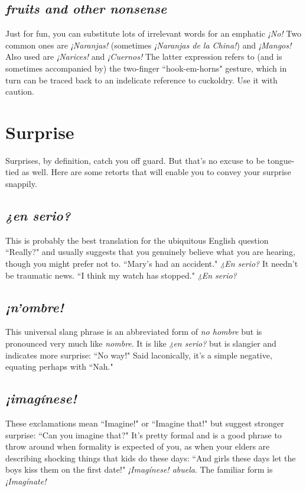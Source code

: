 \subsection{\emph{fruits and other nonsense}}

Just for fun, you can substitute lots of irrelevant words for an
emphatic \emph{¡No!} Two common ones are \emph{¡Naranjas!} (sometimes \emph{¡Naranjas de la China!}) and \emph{¡Mangos!} Also used are \emph{¡Narices!} and \emph{¡Cuernos!}
The latter expression refers to (and is sometimes accompanied by) the
two-finger ``hook-em-horns" gesture, which in turn can be traced back
to an indelicate reference to cuckoldry. Use it with caution.

\section{Surprise}

Surprises, by definition, catch you off guard. But that's no excuse to be tongue-tied as well. Here are some retorts that will enable
you to convey your surprise snappily.

\subsection{\emph{¿en serio?}}

This is probably the best translation for the ubiquitous English
question ``Really?" and usually suggests that you genuinely believe
what you are hearing, though you might prefer not to. ``Mary's had an
accident." \emph{¿En serio?} It needn't be traumatic news. ``I think my watch
has stopped." \emph{¿En serio?}

\subsection{\emph{¡n'ombre!}}

This universal slang phrase is an abbreviated form of \emph{no hombre} but is pronounced very much like \emph{nombre}. It is like \emph{¿en serio?} but
is slangier and indicates more surprise: ``No way!" Said laconically, it's
a simple negative, equating perhaps with ``Nah."

\subsection{\emph{¡imagínese!}}

These exclamations mean ``Imagine!" or ``Imagine that!" but
suggest stronger surprise: ``Can you imagine that?" It's pretty formal
and is a good phrase to throw around when formality is expected of
you, as when your elders are describing shocking things that kids do
these days: ``And girls these days let the boys kiss them on the first
date!" \emph{¡Imagínese! abuela}. The familiar form is \emph{¡Imagínate!}

